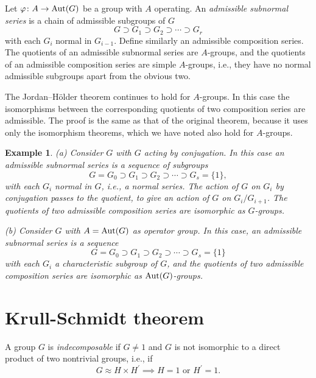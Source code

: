 \documentclass[a4paper,11pt,final]{memoir}%
\newtheorem{example}[X]{Example}
\theoremstyle{nonumberplain}
\begin{document}
Let $\varphi\colon A\rightarrow\operatorname{Aut}(G)$ be a group with $A$ operating. An
\emph{admissible subnormal series\/}%
is a chain of admissible subgroups of $G$
\[
G\supset G_{1}\supset G_{2}\supset\cdots\supset G_{r}%
\]
with each $G_{i}$ normal in $G_{i-1}$. Define similarly an admissible
composition series. The quotients of an admissible subnormal series are
$A$-groups, and the quotients of an admissible composition series are simple
$A$-groups, i.e., they have no normal admissible subgroups apart from the
obvious two.

The Jordan--H\"older theorem continues to hold for $A$-groups. In this case
the isomorphisms between the corresponding quotients of two composition series
are admissible. The proof is the same as that of the original theorem, because
it uses only the isomorphism theorems, which we have noted also hold for $A$-groups.

\begin{example}
\label{ns27}(a) Consider $G$ with $G$ acting by conjugation. In this case an
admissible subnormal series is a sequence of subgroups
\[
G=G_{0}\supset G_{1}\supset G_{2}\supset\cdots\supset G_{s}=\{1\},
\]
with each $G_{i}$ normal in $G$, i.e., a normal series. The action of $G$ on
$G_{i}$ by conjugation passes to the quotient, to give an action of $G$ on
$G_{i}/G_{i+1}$. The quotients of two admissible composition series are
isomorphic as $G$-groups.

(b) Consider $G$ with $A=\operatorname{Aut}(G)$ as operator group. In this case, an
admissible subnormal series is a sequence
\[
G=G_{0}\supset G_{1}\supset G_{2}\supset\cdots\supset G_{s}=\{1\}
\]
with each $G_{i}$ a characteristic subgroup of $G$, and the quotients of two
admissible composition series are isomorphic as $\operatorname{Aut}(G)$-groups.
\end{example}

\section{Krull-Schmidt theorem}

A group $G$ is \emph{indecomposable}%
if $G\neq1$ and $G$ is not isomorphic to a direct product of two nontrivial
groups, i.e., if
\[
G\approx H\times H^{\prime}\implies H=1\text{ or }H^{\prime}=1.
\]
\end{document}
